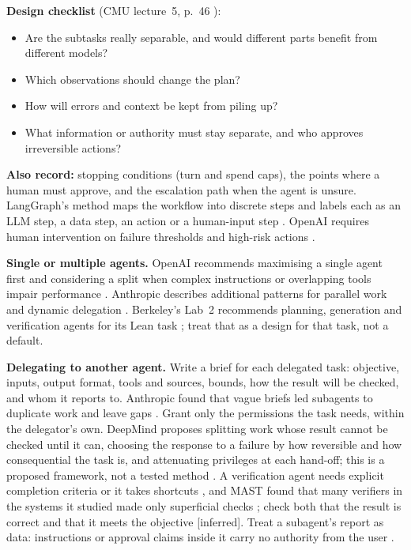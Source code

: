 \documentclass[10pt]{article}
\newcommand{\inferred}{\textsf{\small[inferred]}}
\begin{document}
\textbf{Design checklist} (CMU lecture~5, p.~46 \cite{cmu5}):
\begin{itemize}
\item Are the subtasks really separable, and would different parts benefit from different models?
\item Which observations should change the plan?
\item How will errors and context be kept from piling up?
\item What information or authority must stay separate, and who approves irreversible actions?
\end{itemize}

\textbf{Also record:} stopping conditions (turn and spend caps), the points where a human must approve, and the escalation path when the agent is unsure. LangGraph's method maps the workflow into discrete steps and labels each as an LLM step, a data step, an action or a human-input step \cite[steps~1--2]{langgraph}. OpenAI requires human intervention on failure thresholds and high-risk actions \cite[pp.~24--31]{openai}.

\textbf{Single or multiple agents.} OpenAI recommends maximising a single agent first and considering a split when complex instructions or overlapping tools impair performance \cite[p.~16]{openai}. Anthropic describes additional patterns for parallel work and dynamic delegation \cite[``Parallelization'', ``Orchestrator-workers'']{bea}. Berkeley's Lab~2 recommends planning, generation and verification agents for its Lean task \cite{brkadv}; treat that as a design for that task, not a default.

\textbf{Delegating to another agent.} Write a brief for each delegated task: objective, inputs, output format, tools and sources, bounds, how the result will be checked, and whom it reports to. Anthropic found that vague briefs led subagents to duplicate work and leave gaps \cite[``Prompt engineering and evaluations for research agents'']{anthmulti}. Grant only the permissions the task needs, within the delegator's own. DeepMind proposes splitting work whose result cannot be checked until it can, choosing the response to a failure by how reversible and how consequential the task is, and attenuating privileges at each hand-off; this is a proposed framework, not a tested method \cite[\S4.1, p.~9; \S4.4, p.~13; \S4.7, p.~18]{tomasev}. A verification agent needs explicit completion criteria or it takes shortcuts \cite[``The verification subagent pattern'']{claudemulti}, and MAST found that many verifiers in the systems it studied made only superficial checks \cite[\S4, pp.~7--8]{mast}; check both that the result is correct and that it meets the objective \inferred. Treat a subagent's report as data: instructions or approval claims inside it carry no authority from the user \cite[``Subagent output scanning'']{ccsubagents}.
\end{document}
